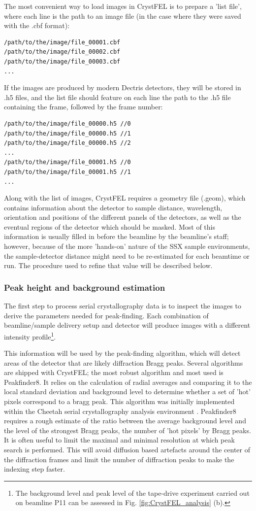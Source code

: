 The most convenient way to load images in CrystFEL is to prepare a 'list file', where each line is the path to an image file (in the case where they were saved with the .cbf format):
\begin{verbatim}
/path/to/the/image/file_00001.cbf
/path/to/the/image/file_00002.cbf
/path/to/the/image/file_00003.cbf
...
\end{verbatim}
If the images are produced by modern Dectris detectors, they will be stored in .h5 files, and the list file should feature on each line the path to the .h5 file containing the frame, followed by the frame number:
\begin{verbatim}
/path/to/the/image/file_00000.h5 //0
/path/to/the/image/file_00000.h5 //1
/path/to/the/image/file_00000.h5 //2
...
/path/to/the/image/file_00001.h5 //0
/path/to/the/image/file_00001.h5 //1
...
\end{verbatim}

Along with the list of images, CrystFEL requires a geometry file (.geom), which contains information about the detector to sample distance, wavelength, orientation and positions of the different panels of the detectors, as well as the eventual regions of the detector which should be masked. Most of this information is usually filled in before the beamline by the beamline's staff; however, because of the more 'hands-on' nature of the SSX sample environments, the sample-detector distance might need to be re-estimated for each beamtime or run. The procedure used to refine that value will be described below. 

\subsubsection{Peak height and background estimation}

The first step to process serial crystallography data is to inspect the images to derive the parameters needed for peak-finding. Each combination of beamline/sample delivery setup and detector will produce images with a different intensity profile\footnote{The background level and peak level of the tape-drive experiment carried out on beamline P11 can be assessed in Fig. \ref{fig:CrystFEL_analysis} (b).}.

This information will be used by the peak-finding algorithm, which will detect areas of the detector that are likely diffraction Bragg peaks. Several algorithms are shipped with CrystFEL; the most robust algorithm and most used is Peakfinder8. It relies on the calculation of radial averages and comparing it to the local standard deviation and background level to determine whether a set of 'hot' pixels correspond to a bragg peak. This algorithm was initially implemented within the Cheetah serial crystallography analysis environment \parencite{bartyCheetahSoftwareHighthroughput2014}. Peakfinder8 requires a rough estimate of the ratio between the average background level and the level of the strongest Bragg peaks, the number of 'hot pixels' by Bragg peaks. It is often useful to limit the maximal and minimal resolution at which peak search is performed. This will avoid diffusion based artefacts around the center of the diffraction frames and limit the number of diffraction peaks to make the indexing step faster. 

